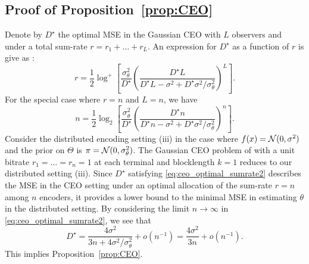 \subsection{Proof of Proposition~\ref{prop:CEO}
\label{app:proof:CEO}}

%
Denote by $D^\star$ the optimal MSE in the Gaussian CEO with $L$ observers and under a total sum-rate $r = r_1 + \ldots +r_L$. An expression for $D^\star$ as a function of $r$ is give as \cite[Eq. 10]{chen2004upper}:
\begin{equation} \label{eq:ceo_optimal_sumrate}
r = \frac{1}{2} \log^+ \left[ \frac{\sigma_\theta^2}{D^\star} \left( \frac{D^\star L}{ D^\star L - \sigma^2 + D^\star \sigma^2 / \sigma_\theta^2 }\right)^L  \right].
\end{equation}
For the special case where $r = n$ and $L=n$, we have
\begin{equation} \label{eq:ceo_optimal_sumrate2}
n = \frac{1}{2} \log_2 \left[ \frac{\sigma_\theta^2}{D^\star} \left(\frac{ D^\star n }{D^\star n - \sigma^2 + D^\star \sigma^2/\sigma_\theta^2 }  \right)^n  \right].
\end{equation}
Consider the distributed encoding setting (iii) in the case where $f(x) = \mathcal{N}(0,\sigma^2)$ and the prior on $\Theta$ is $\pi = \mathcal{N}(0,\sigma_\theta^2)$. The Gaussian CEO problem of \cite{viswanathan1997quadratic} with a unit bitrate $r_1=\ldots = r_n =1$ at each terminal and blocklength $k=1$ reduces to our distributed setting (iii). Since $D^\star$ satisfying \eqref{eq:ceo_optimal_sumrate2} describes the MSE in the CEO setting under an optimal allocation of the sum-rate $r = n$ among $n$ encoders, it provides a lower bound to the minimal MSE in estimating $\theta$ in the distributed setting. By considering the limit $n\rightarrow \infty$ in \eqref{eq:ceo_optimal_sumrate2}, we see that 
\[
D^\star = \frac{ 4\sigma^2 }{3n + 4 \sigma^2 / \sigma_\theta^2 } + o(n^{-1}) =  \frac{4\sigma^2}{3n} + o(n^{-1}). 
\]
This implies Proposition~\ref{prop:CEO}. 
